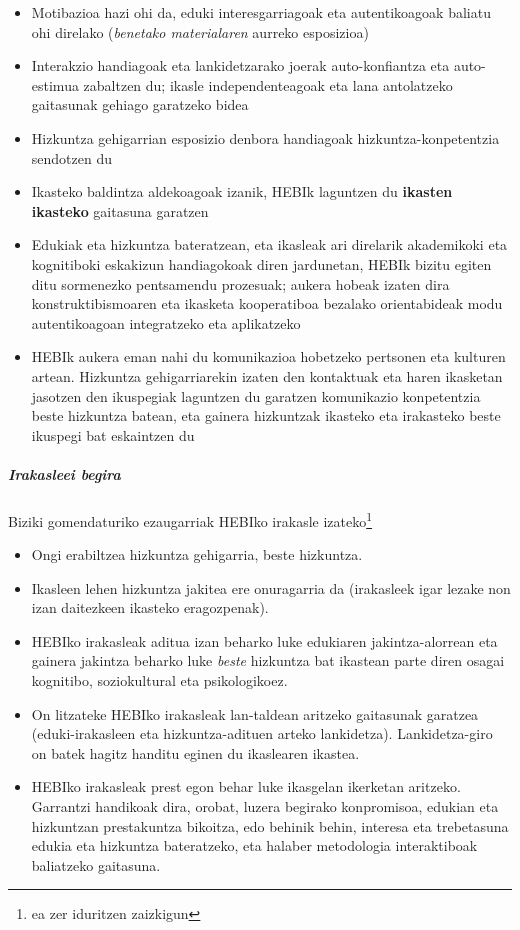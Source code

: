 \documentclass[
]{book}
\providecommand{\tightlist}{%
  \setlength{\itemsep}{0pt}\setlength{\parskip}{0pt}}
\begin{document}
\begin{itemize}
\tightlist
\item
  Motibazioa hazi ohi da, eduki interesgarriagoak eta autentikoagoak baliatu ohi direlako (\emph{benetako materialaren} aurreko esposizioa)
\item
  Interakzio handiagoak eta lankidetzarako joerak auto-konfiantza eta auto-estimua zabaltzen du; ikasle independenteagoak eta lana antolatzeko gaitasunak gehiago garatzeko bidea
\item
  Hizkuntza gehigarrian esposizio denbora handiagoak hizkuntza-konpetentzia sendotzen du
\item
  Ikasteko baldintza aldekoagoak izanik, HEBIk laguntzen du \textbf{ikasten ikasteko} gaitasuna garatzen
\item
  Edukiak eta hizkuntza bateratzean, eta ikasleak ari direlarik akademikoki eta kognitiboki eskakizun handiagokoak diren jardunetan, HEBIk bizitu egiten ditu sormenezko pentsamendu prozesuak; aukera hobeak izaten dira konstruktibismoaren eta ikasketa kooperatiboa bezalako orientabideak modu autentikoagoan integratzeko eta aplikatzeko
\item
  HEBIk aukera eman nahi du komunikazioa hobetzeko pertsonen eta kulturen artean. Hizkuntza gehigarriarekin izaten den kontaktuak eta haren ikasketan jasotzen den ikuspegiak laguntzen du garatzen komunikazio konpetentzia beste hizkuntza batean, eta gainera hizkuntzak ikasteko eta irakasteko beste ikuspegi bat eskaintzen du
\end{itemize}

\hypertarget{irakasleei-begira}{%
\subparagraph{Irakasleei begira}\label{irakasleei-begira}}

Biziki gomendaturiko ezaugarriak HEBIko irakasle izateko\footnote{ea zer iduritzen zaizkigun}

\begin{itemize}
\tightlist
\item
  Ongi erabiltzea hizkuntza gehigarria, beste hizkuntza.
\item
  Ikasleen lehen hizkuntza jakitea ere onuragarria da (irakasleek igar lezake non izan daitezkeen ikasteko eragozpenak).
\item
  HEBIko irakasleak aditua izan beharko luke edukiaren jakintza-alorrean eta gainera jakintza beharko luke \emph{beste} hizkuntza bat ikastean parte diren osagai kognitibo, soziokultural eta psikologikoez.
\item
  On litzateke HEBIko irakasleak lan-taldean aritzeko gaitasunak garatzea (eduki-irakasleen eta hizkuntza-adituen arteko lankidetza). Lankidetza-giro on batek hagitz handitu eginen du ikaslearen ikastea.
\item
  HEBIko irakasleak prest egon behar luke ikasgelan ikerketan aritzeko. Garrantzi handikoak dira, orobat, luzera begirako konpromisoa, edukian eta hizkuntzan prestakuntza bikoitza, edo behinik behin, interesa eta trebetasuna edukia eta hizkuntza bateratzeko, eta halaber metodologia interaktiboak baliatzeko gaitasuna.
\end{itemize}
\end{document}
